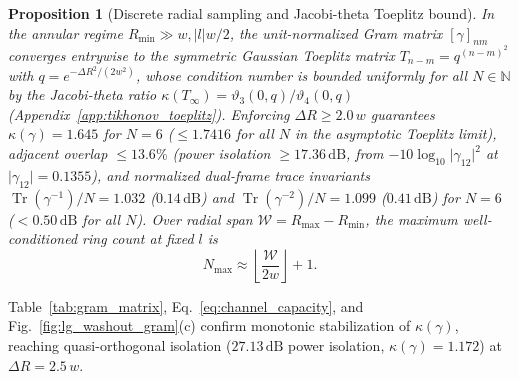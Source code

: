 \documentclass[aps,pra,onecolumn,notitlepage,11pt,tightenlines,nofootinbib,floatfix,longbibliography]{revtex4-2}
\newtheorem{proposition}{Proposition}
\theoremstyle{remark}
\newcommand{\abs}[1]{\lvert #1 \rvert}
\begin{document}
\begin{proposition}[Discrete radial sampling and Jacobi-theta Toeplitz bound]
\label{prop:channel_capacity}
In the annular regime $R_{\min} \gg w, \abs{l}w/2$, the unit-normalized Gram matrix $[\gamma]_{nm}$ converges entrywise to the symmetric Gaussian Toeplitz matrix $T_{n-m} = q^{(n-m)^2}$ with $q = e^{-\Delta R^2/(2w^2)}$, whose condition number is bounded uniformly for all $N \in \mathbb{N}$ by the Jacobi-theta ratio $\kappa(T_\infty) = \vartheta_3(0,q)/\vartheta_4(0,q)$ (Appendix~\ref{app:tikhonov_toeplitz}). Enforcing $\Delta R \ge 2.0\,w$ guarantees $\kappa(\gamma) = 1.645$ for $N = 6$ ($\le 1.7416$ for all $N$ in the asymptotic Toeplitz limit), adjacent overlap $\le 13.6\%$ (power isolation $\ge 17.36\,\mathrm{dB}$, from $-10\log_{10}\abs{\gamma_{12}}^2$ at $\abs{\gamma_{12}} = 0.1355$), and normalized dual-frame trace invariants $\operatorname{Tr}(\gamma^{-1})/N = 1.032$ ($0.14\,\mathrm{dB}$) and $\operatorname{Tr}(\gamma^{-2})/N = 1.099$ ($0.41\,\mathrm{dB}$) for $N = 6$ ($< 0.50\,\mathrm{dB}$ for all $N$). Over radial span $\mathcal{W} = R_{\max} - R_{\min}$, the maximum well-conditioned ring count at fixed $l$ is
\begin{equation}
N_{\max} \approx \left\lfloor \frac{\mathcal{W}}{2w} \right\rfloor + 1.
\label{eq:channel_capacity}
\end{equation}
\end{proposition}

Table~\ref{tab:gram_matrix}, Eq.~\eqref{eq:channel_capacity}, and Fig.~\ref{fig:lg_washout_gram}(c) confirm monotonic stabilization of $\kappa(\gamma)$, reaching quasi-orthogonal isolation ($27.13\,\mathrm{dB}$ power isolation, $\kappa(\gamma) = 1.172$) at $\Delta R = 2.5\,w$.
\end{document}

